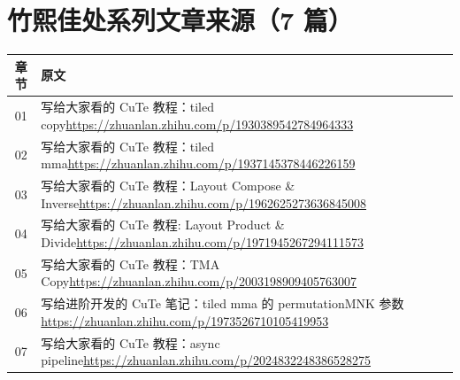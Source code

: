 \documentclass[9pt,openany]{ctexbook}
\begin{document}
\section*{竹熙佳处系列文章来源（7 篇）}
\begingroup\small
\begin{tabular}{@{}c>{\raggedright\arraybackslash}p{}@{}}
  \toprule
  章节 & 原文 \\
  \midrule
  01 & 写给大家看的 CuTe 教程：tiled copy\newline\url{https://zhuanlan.zhihu.com/p/1930389542784964333} \\
  02 & 写给大家看的 CuTe 教程：tiled mma\newline\url{https://zhuanlan.zhihu.com/p/1937145378446226159} \\
  03 & 写给大家看的 CuTe 教程：Layout Compose \& Inverse\newline\url{https://zhuanlan.zhihu.com/p/1962625273636845008} \\
  04 & 写给大家看的 CuTe 教程: Layout Product \& Divide\newline\url{https://zhuanlan.zhihu.com/p/1971945267294111573} \\
  05 & 写给大家看的 CuTe 教程：TMA Copy\newline\url{https://zhuanlan.zhihu.com/p/2003198909405763007} \\
  06 & 写给进阶开发的 CuTe 笔记：tiled mma 的 permutationMNK 参数\newline\url{https://zhuanlan.zhihu.com/p/1973526710105419953} \\
  07 & 写给大家看的 CuTe 教程：async pipeline\newline\url{https://zhuanlan.zhihu.com/p/2024832248386528275} \\
  \bottomrule
\end{tabular}
\endgroup
\end{document}
